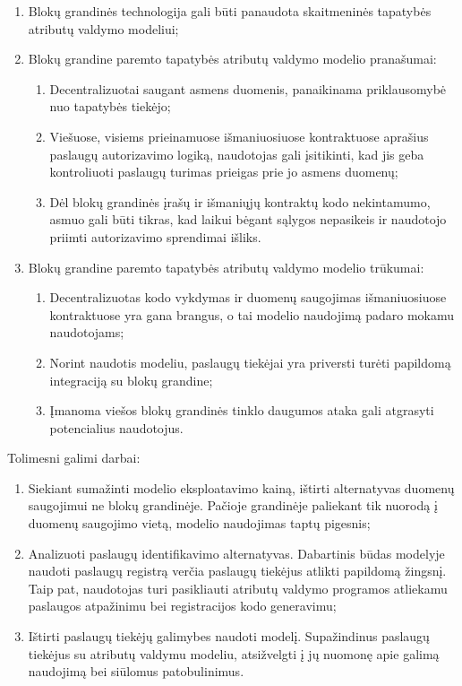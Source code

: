 \renewcommand{\labelenumii}{\arabic{enumii}.}
\begin{enumerate}
    \item Blokų grandinės technologija gali būti panaudota skaitmeninės tapatybės atributų valdymo modeliui;
    \item Blokų grandine paremto tapatybės atributų valdymo modelio pranašumai:
    \begin{enumerate}
        \item Decentralizuotai saugant asmens duomenis,
        panaikinama priklausomybė nuo tapatybės tiekėjo;
        \item Viešuose, visiems prieinamuose
        išmaniuosiuose kontraktuose aprašius paslaugų autorizavimo logiką, naudotojas gali įsitikinti,
        kad jis geba kontroliuoti paslaugų turimas prieigas prie jo asmens duomenų;
        \item Dėl blokų grandinės įrašų ir išmaniųjų kontraktų kodo
        nekintamumo, asmuo gali būti tikras, kad laikui bėgant sąlygos nepasikeis ir naudotojo priimti
        autorizavimo sprendimai išliks.
    \end{enumerate}
    \item Blokų grandine paremto tapatybės atributų valdymo modelio trūkumai:
    \begin{enumerate}
        \item Decentralizuotas kodo vykdymas ir duomenų saugojimas išmaniuosiuose kontraktuose yra gana brangus,
        o tai modelio naudojimą padaro mokamu naudotojams;
        \item Norint naudotis modeliu, paslaugų tiekėjai yra priversti turėti papildomą integraciją su blokų grandine;
        \item Įmanoma viešos blokų grandinės tinklo daugumos ataka gali atgrasyti potencialius naudotojus.
    \end{enumerate}
\end{enumerate}

Tolimesni galimi darbai:

\begin{enumerate}
    \item Siekiant sumažinti modelio eksploatavimo kainą, ištirti alternatyvas duomenų saugojimui ne blokų grandinėje. Pačioje grandinėje
    paliekant tik nuorodą į duomenų saugojimo vietą, modelio naudojimas taptų pigesnis;
    \item Analizuoti paslaugų identifikavimo alternatyvas. Dabartinis būdas modelyje naudoti paslaugų registrą verčia paslaugų tiekėjus atlikti
    papildomą žingsnį. Taip pat, naudotojas turi pasikliauti atributų valdymo programos atliekamu paslaugos atpažinimu bei registracijos kodo generavimu;
    \item Ištirti paslaugų tiekėjų galimybes naudoti modelį. Supažindinus paslaugų tiekėjus su atributų valdymu modeliu,
    atsižvelgti į jų nuomonę apie galimą naudojimą bei siūlomus patobulinimus.
\end{enumerate}